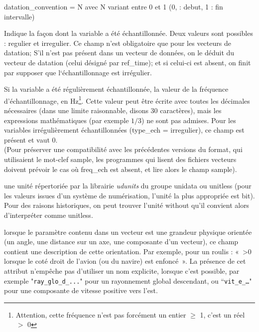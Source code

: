 \begin{description}
	datation\_convention = N avec N variant entre 0 et 1  (0, : debut, 1 : fin intervalle)
    \item[type\_ech] Indique la façon dont la variable a
   été échantillonnée. Deux valeurs sont 
  possibles : \textsf{regulier} et \textsf{irregulier}.
   Ce champ n'est obligatoire que pour les vecteurs de datation; 
  S'il n'est pas présent dans un vecteur de données, on le déduit du
vecteur de datation (celui désigné par
\textsf{ref\_time}); et si celui-ci est absent, on finit par supposer que
l`échantillonnage est irrégulier.
    \item[freq\_ech] Si la variable a été
régulièrement échantillonnée, la valeur de la
fréquence d'échantillonnage, en Hz\footnote{Attention, cette
fréquence n'est pas forcément un entier $\ge$ 1, c'est un
réel $>$ 0}. Cette valeur peut être écrite avec toutes les décimales
nécessaires (dans une limite raisonnable, disons 30 caractères), mais
les expressions mathématiques (par exemple $ 1 / 3$) ne sont pas admises.
Pour les variables irrégulièrement échantillonnées (\textsf{type\_ech = irregulier}), ce champ est
présent et vaut 0.\\
  (Pour préserver une compatibilité
avec les précédentes versions du format, qui utilisaient le
mot-clef \textsf{sample}, les programmes qui lisent des fichiers vecteurs
doivent prévoir le cas où \textsf{freq\_ech} est absent, et
lire alors le champ \textsf{sample}).
    \item[unit] une unité répertoriée par la librairie \textit{udunits} du
                groupe unidata ou \textsf{unitless} (pour les valeurs issues
                d'un système de numérisation, l'unité la plus appropriée est
                \textsf{bit}). \\
                Pour des raisons historiques, on peut trouver l'unité
                \textsf{without} qu'il convient alors d'interpréter comme
                \textsf{unitless}.
  \item[orientation] lorsque le paramètre contenu dans un vecteur est
une grandeur physique orientée (un angle, une distance sur un axe, une
composante d'un vecteur), ce champ contient une description de cette
orientation. Par exemple, pour un roulis : «~>0 lorsque le coté droit
de l'avion (ou du navire) est enfoncé~». La présence de cet attribut n'empêche
pas d'utiliser un nom explicite, lorsque c'est possible, par exemple
"\texttt{ray\_glo\_d\_...}" pour un rayonnement global descendant, ou ``\texttt{vit\_e\_\ldots}"
pour une composante de vitesse positive vers l'est.


\end{description}
